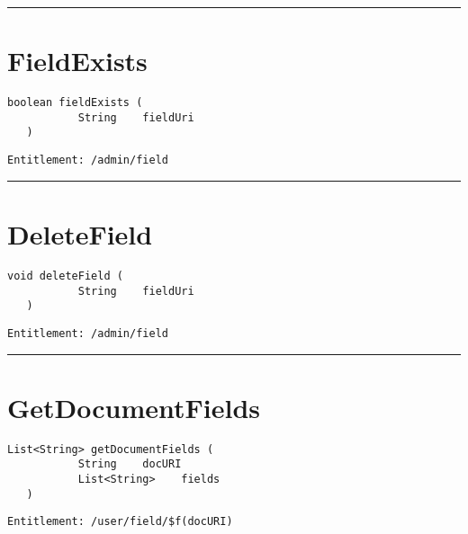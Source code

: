 \rule{12cm}{2pt}
\section{FieldExists}
\label{Api:FieldExists}
\begin{lstlisting}[style=nonumbers]
   boolean fieldExists (
           String    fieldUri
   )
\end{lstlisting}
\begin{Verbatim}[formatcom=\color{Maroon}]
  Entitlement: /admin/field
\end{Verbatim}



\rule{12cm}{2pt}
\section{DeleteField}
\label{Api:DeleteField}
\begin{lstlisting}[style=nonumbers]
   void deleteField (
           String    fieldUri
   )
\end{lstlisting}
\begin{Verbatim}[formatcom=\color{Maroon}]
  Entitlement: /admin/field
\end{Verbatim}



\rule{12cm}{2pt}
\section{GetDocumentFields}
\label{Api:GetDocumentFields}
\begin{lstlisting}[style=nonumbers]
   List<String> getDocumentFields (
           String    docURI
           List<String>    fields
   )
\end{lstlisting}
\begin{Verbatim}[formatcom=\color{Maroon}]
  Entitlement: /user/field/$f(docURI)
\end{Verbatim}



